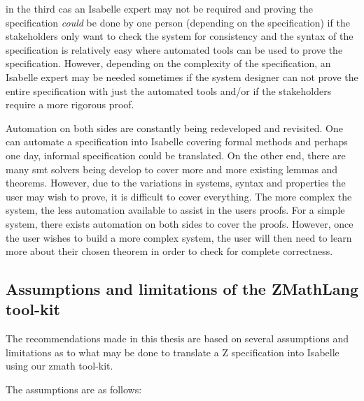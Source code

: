 in the third cas an Isabelle expert may not be
required and proving the specification \textit{could} be done by one person
(depending on the specification) if the stakeholders only want to check the system for consistency
and
the syntax of the specification is relatively easy where automated tools can be
used to prove the specification. However, depending on the complexity of the
specification, an Isabelle expert may be needed sometimes if the system designer
can not prove the entire specification with just the automated tools and/or if
the stakeholders require a more rigorous proof.

Automation on both sides are constantly being redeveloped and revisited. One can
automate a specification into Isabelle covering formal methods and perhaps one
day, informal specification could be translated. On the other end, there are
many \gls{smt} solvers being develop to cover more and more existing lemmas and
theorems. However, due to the variations in systems, syntax and properties the
user may wish to prove, it is difficult to cover everything. The more complex
the system, the less automation available to assist in the users proofs. For a
simple system, there exists automation on both sides to cover the proofs.
However, once the user wishes to build a more complex system, the user will then
need to learn more about their chosen theorem in order to check for complete
correctness.

\subsection{Assumptions and limitations of the ZMathLang tool-kit}

The recommendations made in this thesis are based on several assumptions and
limitations as to what may be done to translate a Z specification into Isabelle
using our \gls{zmath} tool-kit.

The assumptions are as follows:


